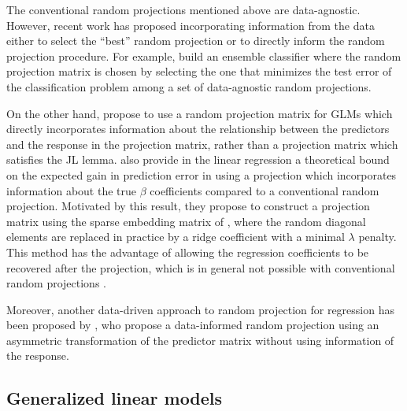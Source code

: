\documentclass[
  article]{jss}
\begin{document}
The conventional random projections mentioned above are data-agnostic.
However, recent work has proposed incorporating information from the
data either to select the ``best'' random projection or to directly
inform the random projection procedure. For example,
\citet{cannings2017random} build an ensemble classifier where the random
projection matrix is chosen by selecting the one that minimizes the test
error of the classification problem among a set of data-agnostic random
projections.

On the other hand, \citet{parzer2024glms} propose to use a random
projection matrix for GLMs which directly incorporates information about
the relationship between the predictors and the response in the
projection matrix, rather than a projection matrix which satisfies the
JL lemma. \citet{parzer2024sparse} also provide in the linear regression
a theoretical bound on the expected gain in prediction error in using a
projection which incorporates information about the true \(\beta\)
coefficients compared to a conventional random projection. Motivated by
this result, they propose to construct a projection matrix using the
sparse embedding matrix of \citet{Clarkson2013LowRankApprox}, where the
random diagonal elements are replaced in practice by a ridge coefficient
with a minimal \(\lambda\) penalty. This method has the advantage of
allowing the regression coefficients to be recovered after the
projection, which is in general not possible with conventional random
projections \citep{Thanei2017RPforHDR}.

Moreover, another data-driven approach to random projection for
regression has been proposed by \citet{ryder2019asymmetric}, who propose
a data-informed random projection using an asymmetric transformation of
the predictor matrix without using information of the response.

\subsection{Generalized linear models}\label{generalized-linear-models}
\end{document}
